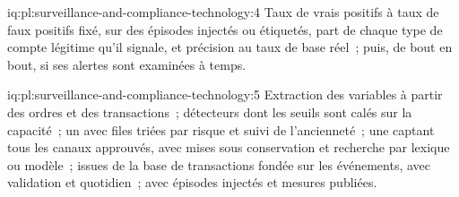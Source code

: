 \begin{solution}{iq:pl:surveillance-and-compliance-technology:4}
Taux de vrais positifs à taux de faux positifs fixé, sur des épisodes injectés ou étiquetés, part de chaque type de compte légitime qu'il signale, et
précision au taux de base réel~; puis, de bout en bout, si ses alertes sont examinées à temps.
\end{solution}

\begin{solution}{iq:pl:surveillance-and-compliance-technology:5}
Extraction des variables à partir des ordres et des transactions~; détecteurs dont les seuils sont calés sur la capacité~; un  avec files triées par risque
et suivi de l'ancienneté~; une  captant tous les canaux approuvés, avec mises sous conservation et recherche par lexique ou modèle~;  issues de la
base de transactions fondée sur les événements, avec validation et  quotidien~;  avec épisodes injectés et mesures publiées.
\end{solution}
